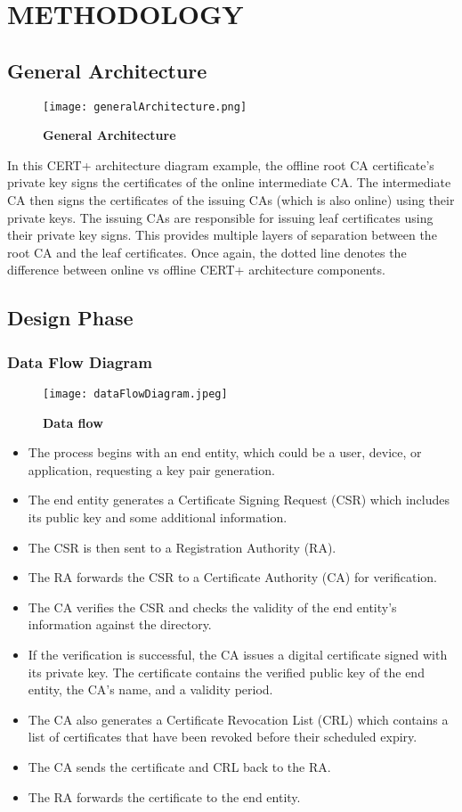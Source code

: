 \documentclass[10pt]{report}
\begin{document}
\chapter{METHODOLOGY}
\linespread{1.5}
\section{General Architecture}
\large
\begin{figure}[H]
\centering
\texttt{[image: generalArchitecture.png]}
\caption{\textbf{General Architecture}}
\end{figure}
In this CERT+ architecture diagram example, the offline root CA certificate’s private key signs the certificates of the online intermediate CA. The intermediate CA then signs the certificates of the issuing CAs (which is also online) using their private keys. The issuing CAs are responsible for issuing leaf certificates using their private key signs. This provides multiple layers of separation between the root CA and the leaf certificates. Once again, the dotted line denotes the difference between online vs offline CERT+ architecture components. 
\section{Design Phase }
\subsection{Data Flow Diagram}
\begin{figure}[H]
\centering
\texttt{[image: dataFlowDiagram.jpeg]}
\caption{\textbf{Data flow}}
\end{figure}
\begin{itemize}[label=--]
    \item The process begins with an end entity, which could be a user, device, or application, requesting a key pair generation.
    \item The end entity generates a Certificate Signing Request (CSR) which includes its public key and some additional information.
    \item The CSR is then sent to a Registration Authority (RA).
    \item The RA forwards the CSR to a Certificate Authority (CA) for verification.
    \item The CA verifies the CSR and checks the validity of the end entity’s information against the directory.
    \item If the verification is successful, the CA issues a digital certificate signed with its private key. The certificate contains the verified public key of the end entity, the CA’s name, and a validity period.
    \item The CA also generates a Certificate Revocation List (CRL) which contains a list of certificates that have been revoked before their scheduled expiry.
    \item The CA sends the certificate and CRL back to the RA.
    \item The RA forwards the certificate to the end entity.
\end{itemize}
\end{document}
